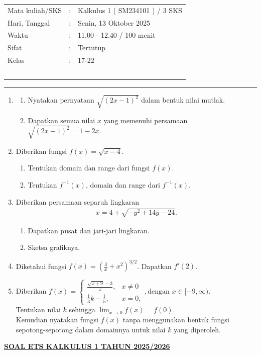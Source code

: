 \documentclass[10pt,openany,a4paper]{article}
\theoremstyle{definition}
\theoremstyle{definition}
\theoremstyle{plain}
\begin{document}
    \begin{center}
	\begin{tabular}{lcl}
		Mata kuliah/SKS & : & Kalkulus 1 ( SM234101 ) / 3 SKS\\
		Hari, Tanggal & : & Senin, 13 Oktober 2025\\
		Waktu & : & 11.00 - 12.40 / 100 menit\\
		Sifat & : & Tertutup\\
		Kelas & : & 17-22\\
  ~
	\end{tabular}
    
    \noindent\rule{\textwidth}{2.pt}
        \end{center}
\begin{enumerate}
    \item \begin{enumerate}
        \item Nyatakan pernyataan $\sqrt{(2x-1)^2}$ dalam bentuk nilai mutlak.
        \item Dapatkan semua nilai $x$ yang memenuhi persamaan $\sqrt{(2x-1)^2}=1-2x$.
    \end{enumerate}
    \item Diberikan fungsi $f(x)=\sqrt{x-4}$.
    \begin{enumerate}
        \item Tentukan domain dan range dari fungsi $f(x)$.
        \item Tentukan $f^{-1}(x)$, domain dan range dari $f^{-1}(x)$.
    \end{enumerate}
    \item Diberikan persamaan separuh lingkaran 
    \begin{align*}
       x=4+\sqrt{-y^2+14y-24}.
    \end{align*}
    \begin{enumerate}
        \item Dapatkan pusat dan jari-jari lingkaran. 
        \item Sketsa grafiknya.
    \end{enumerate}
    \item Diketahui fungsi $f(x)=\left(\frac{3}{x}+x^2\right)^{3/2}$. Dapatkan $f'(2)$.
    \item Diberikan $f(x)=\begin{cases}
        \frac{\sqrt{x+9}-3}{x}, &x\neq 0\\
        \frac{1}{3}k-\frac{1}{5}, &x=0,
    \end{cases}, \text{dengan } x\in [-9,\infty)$.\\
    Tentukan nilai $k$ sehingga $\displaystyle\lim_{x\to 0}f(x)=f(0)$.\\
    Kemudian nyatakan fungsi $f(x)$ tanpa menggunakan bentuk fungsi sepotong-sepotong dalam domainnya untuk nilai $k$ yang diperoleh.
\end{enumerate}
\newpage
 \begin{center}
	{\underline{\textbf{\MakeUppercase{Soal ETS Kalkulus 1 Tahun 2025/2026}}}}
    \end{center}
\end{document}
